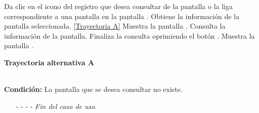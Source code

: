 	\begin{UCtrayectoria}
		\UCpaso[\UCactor] Da clic en el icono  del registro que desea consultar de la pantalla  o la liga correspondiente a una pantalla en la pantalla .
		\UCpaso[\UCsist] Obtiene la información de la pantalla seleccionada. \hyperlink{CU11-4:TAA}{[Trayectoria A]}
		\UCpaso[\UCsist] Muestra la pantalla .
		\UCpaso[\UCactor] Consulta la información de la pantalla.
		\UCpaso[\UCactor] Finaliza la consulta oprimiendo el botón .
		\UCpaso[\UCsist] Muestra la pantalla .
	\end{UCtrayectoria}		
	\hypertarget{CU11-4:TAA}{\textbf{Trayectoria alternativa A}}\\
	\noindent \textbf{Condición:} La pantalla que se desea consultar no existe.
	\begin{enumerate}
		\UCpaso[\UCsist] Muestra la pantalla  con el mensaje .
		\item[- -] - - {\em {Fin del caso de uso}}.
	\end{enumerate}

	
